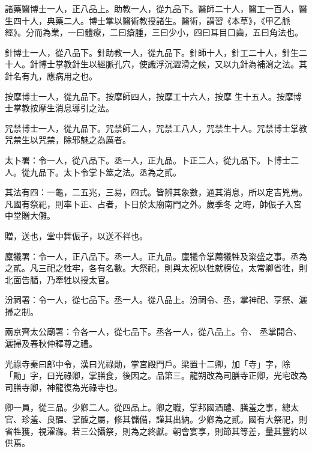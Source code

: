 \begin{pinyinscope}
 諸藥醫博士一人，正八品上。助教一人，從九品下。醫師二十人，醫工一百人，醫生四十人，典藥二人。博士掌以醫術教授諸生。醫術，謂習《本草》，《甲乙脈經》。分而為業，一曰體療，二曰瘡腫，三曰少小，四曰耳目口齒，五曰角法也。



 針博士一人，從八品下。針助教一人，從九品下。針師十人，針工二十人，針生二十人。針博士掌教針生以經脈孔穴，使識浮沉澀滑之候，又以九針為補瀉之法。其針名有九，應病用之也。



 按摩博士一人，從九品下。按摩師四人，按摩工十六人，按摩
 生十五人。按摩博士掌教按摩生消息導引之法。



 咒禁博士一人，從九品下。咒禁師二人，咒禁工八人，咒禁生十人。咒禁博士掌教咒禁生以咒禁，除邪魅之為厲者。



 太卜署：令一人，從八品下。丞一人，正九品。卜正二人，從九品下。卜博士二人。從九品下。太卜令掌卜筮之法。丞為之貳。



 其法有四：一龜，二五兆，三易，四式。皆辨其象數，通其消息，所以定吉兇焉。凡國有祭祀，則率卜正、占者，卜日於太廟南門之外。歲季冬
 之晦，帥侲子入宮中堂贈大儺。



 贈，送也，堂中舞侲子，以送不祥也。



 廩犧署：令一人，正八品下。丞一人。正九品。廩犧令掌薦犧牲及粢盛之事。丞為之貳。凡三祀之牲牢，各有名數。大祭祀，則與太祝以牲就榜位，太常卿省牲，則北面告腯，乃牽牲以授太官。



 汾祠署：令一人，從七品下。丞一人。從八品上。汾祠令、丞，掌神祀、享祭、灑掃之制。



 兩京齊太公廟署：令各一人，從七品下。丞各一人，從八品上。令、
 丞掌開合、灑掃及春秋仲釋尊之禮。



 光祿寺秦曰郎中令，漢曰光祿勛，掌宮殿門戶。梁置十二卿，加「寺」字，除「勛」字，曰光祿卿，掌膳食，後因之。品第三。龍朔改為司膳寺正卿，光宅改為司膳寺卿，神龍復為光祿寺也。



 卿一員，從三品。少卿二人。從四品上。卿之職，掌邦國酒醴、膳羞之事，總太官、珍羞、良醖、掌醢之屬，修其儲備，謹其出納。少卿為之貳。國有大祭祀，則省牲獲，視濯滌。若三公攝祭，則為之終獻。朝會宴享，則節其等差，量其豐約以供焉。




\end{pinyinscope}
